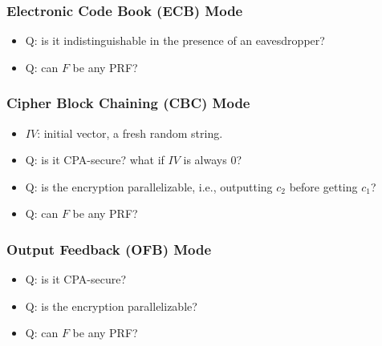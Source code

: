 \begin{frame}\frametitle{Electronic Code Book (ECB) Mode}
\begin{figure}
\begin{center}

\end{center}
\end{figure}
\begin{itemize}
\item \alert{Q: is it indistinguishable in the presence of an eavesdropper?}
\item \alert{Q: can $F$ be any PRF?}
\end{itemize}
\end{frame}
\begin{frame}\frametitle{Cipher Block Chaining (CBC) Mode}
\begin{figure}
\begin{center}

\end{center}
\end{figure}
\begin{itemize}
\item $IV$: initial vector, a fresh random string.
\item \alert{Q: is it CPA-secure? what if $IV$ is always $0$?}
\item \alert{Q: is the encryption parallelizable, i.e., outputting $c_{2}$ before getting $c_{1}$?}
\item \alert{Q: can $F$ be any PRF?}
\end{itemize}
\end{frame}
\begin{frame}\frametitle{Output Feedback (OFB) Mode}
\begin{figure}
\begin{center}

\end{center}
\end{figure}
\begin{itemize}
\item \alert{Q: is it CPA-secure?}
\item \alert{Q: is the encryption parallelizable?}
\item \alert{Q: can $F$ be any PRF?}
\end{itemize}
\end{frame}
